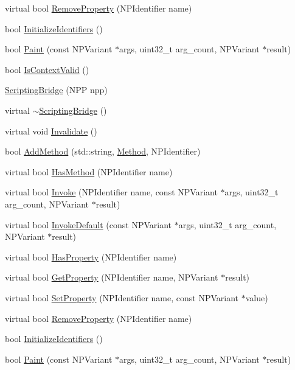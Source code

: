 \begin{DoxyCompactItemize}
\item 
virtual bool \hyperlink{classbridge_1_1_scripting_bridge_a861437163b8291eb7b302ce8f778022d}{RemoveProperty} (NPIdentifier name)
\item 
bool \hyperlink{classbridge_1_1_scripting_bridge_a05f2a65b751d12e6aeaa00bfd91ef83f}{InitializeIdentifiers} ()
\item 
bool \hyperlink{classbridge_1_1_scripting_bridge_abfdee6fdc6c4f0cc6007425a14e8384e}{Paint} (const NPVariant $\ast$args, uint32\_\-t arg\_\-count, NPVariant $\ast$result)
\item 
bool \hyperlink{classbridge_1_1_scripting_bridge_ad09cd2cdc6df27d2c3f1ae6cda6d6958}{IsContextValid} ()
\item 
\hyperlink{classbridge_1_1_scripting_bridge_a9f6cceea3738d76e33f47ba8ad5f72d9}{ScriptingBridge} (NPP npp)
\item 
virtual \hyperlink{classbridge_1_1_scripting_bridge_ac47a1623f245bd55f96ea8cb007b24cb}{$\sim$ScriptingBridge} ()
\item 
virtual void \hyperlink{classbridge_1_1_scripting_bridge_a956430a5ae42b3e30c3e1b4655322061}{Invalidate} ()
\item 
bool \hyperlink{classbridge_1_1_scripting_bridge_a24f9e87d1beed97f7231010636d5af55}{AddMethod} (std::string, \hyperlink{classbridge_1_1_scripting_bridge_aa2d60d52b4e91aa7659850b73f393727}{Method}, NPIdentifier)
\item 
virtual bool \hyperlink{classbridge_1_1_scripting_bridge_af968e6487c5cc9e2566118634c0ab561}{HasMethod} (NPIdentifier name)
\item 
virtual bool \hyperlink{classbridge_1_1_scripting_bridge_a84f78dde38b524b61e72afebf7210483}{Invoke} (NPIdentifier name, const NPVariant $\ast$args, uint32\_\-t arg\_\-count, NPVariant $\ast$result)
\item 
virtual bool \hyperlink{classbridge_1_1_scripting_bridge_aec42e4cce5b1ff9187d98b88b07d11d3}{InvokeDefault} (const NPVariant $\ast$args, uint32\_\-t arg\_\-count, NPVariant $\ast$result)
\item 
virtual bool \hyperlink{classbridge_1_1_scripting_bridge_ad2cb9f2b860ba05a86c10f0824699e33}{HasProperty} (NPIdentifier name)
\item 
virtual bool \hyperlink{classbridge_1_1_scripting_bridge_aa7f5844674672f5872137ffee032427e}{GetProperty} (NPIdentifier name, NPVariant $\ast$result)
\item 
virtual bool \hyperlink{classbridge_1_1_scripting_bridge_a918981b30a60d961232e693e7ac15652}{SetProperty} (NPIdentifier name, const NPVariant $\ast$value)
\item 
virtual bool \hyperlink{classbridge_1_1_scripting_bridge_aeda2f5f7f5669003d573cdc2f3dc8fe8}{RemoveProperty} (NPIdentifier name)
\item 
bool \hyperlink{classbridge_1_1_scripting_bridge_a86ef6533d8f6ed9573890f017c6084d9}{InitializeIdentifiers} ()
\item 
bool \hyperlink{classbridge_1_1_scripting_bridge_a44eeaa7c1de524f8df7f218c1b53233b}{Paint} (const NPVariant $\ast$args, uint32\_\-t arg\_\-count, NPVariant $\ast$result)
\end{DoxyCompactItemize}
